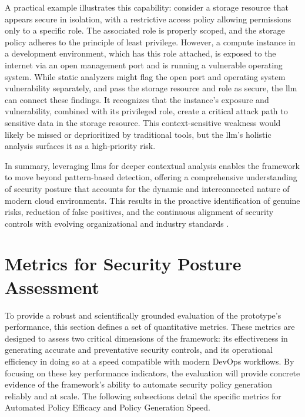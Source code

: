 A practical example illustrates this capability: consider a storage resource that appears secure in isolation, with a restrictive access policy allowing permissions only to a specific role. The associated role is properly scoped, and the storage policy adheres to the principle of least privilege. However, a compute instance in a development environment, which has this role attached, is exposed to the internet via an open management port and is running a vulnerable operating system. While static analyzers might flag the open port and operating system vulnerability separately, and pass the storage resource and role as secure, the \gls{llm} can connect these findings. It recognizes that the instance’s exposure and vulnerability, combined with its privileged role, create a critical attack path to sensitive data in the storage resource. This context-sensitive weakness would likely be missed or deprioritized by traditional tools, but the \gls{llm}’s holistic analysis surfaces it as a high-priority risk.

In summary, leveraging \glspl{llm} for deeper contextual analysis enables the framework to move beyond pattern-based detection, offering a comprehensive understanding of security posture that accounts for the dynamic and interconnected nature of modern cloud environments. This results in the proactive identification of genuine risks, reduction of false positives, and the continuous alignment of security controls with evolving organizational and industry standards \cite{haque_sok_2025}.

\section{Metrics for Security Posture Assessment} %
\label{sec:Metrics for Security Posture Assessment}

To provide a robust and scientifically grounded evaluation of the prototype's performance, this section defines a set of quantitative metrics. These metrics are designed to assess two critical dimensions of the framework: its effectiveness in generating accurate and preventative security controls, and its operational efficiency in doing so at a speed compatible with modern DevOps workflows. By focusing on these key performance indicators, the evaluation will provide concrete evidence of the framework's ability to automate security policy generation reliably and at scale. The following subsections detail the specific metrics for Automated Policy Efficacy and Policy Generation Speed.

